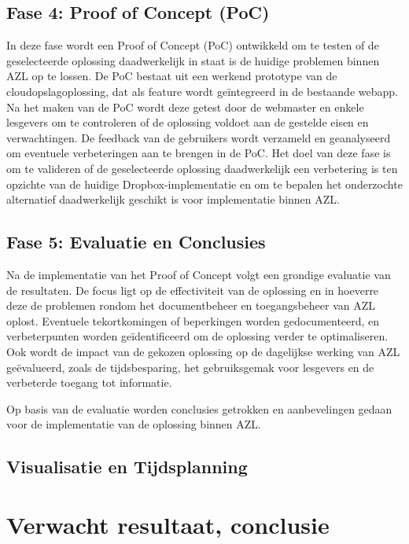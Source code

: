 \subsection{Fase 4: Proof of Concept (PoC)}
In deze fase wordt een Proof of Concept (PoC) ontwikkeld om te testen of de geselecteerde oplossing daadwerkelijk in staat is de huidige problemen binnen AZL op te lossen. De PoC bestaat uit een werkend prototype van de cloudopslagoplossing, dat als feature wordt geïntegreerd in de bestaande webapp. Na het maken van de PoC wordt deze getest door de webmaster en enkele lesgevers om te controleren of de oplossing voldoet aan de gestelde eisen en verwachtingen. De feedback van de gebruikers wordt verzameld en geanalyseerd om eventuele verbeteringen aan te brengen in de PoC. Het doel van deze fase is om te valideren of de geselecteerde oplossing daadwerkelijk een verbetering is ten opzichte van de huidige Dropbox-implementatie en om te bepalen het onderzochte alternatief daadwerkelijk geschikt is voor implementatie binnen AZL.
\subsection{Fase 5: Evaluatie en Conclusies}
Na de implementatie van het Proof of Concept volgt een grondige evaluatie van de resultaten. De focus ligt op de effectiviteit van de oplossing en in hoeverre deze de problemen rondom het documentbeheer en toegangsbeheer van AZL oplost. Eventuele tekortkomingen of beperkingen worden gedocumenteerd, en verbeterpunten worden geïdentificeerd om de oplossing verder te optimaliseren. Ook wordt de impact van de gekozen oplossing op de dagelijkse werking van AZL geëvalueerd, zoals de tijdsbesparing, het gebruiksgemak voor lesgevers en de verbeterde toegang tot informatie.

Op basis van de evaluatie worden conclusies getrokken en aanbevelingen gedaan voor de implementatie van de oplossing binnen AZL.
\subsection{Visualisatie en Tijdsplanning}



\section{Verwacht resultaat, conclusie}%
\label{sec:verwachte_resultaten}

